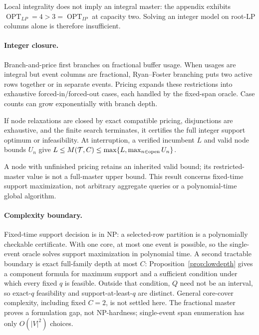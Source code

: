 Local integrality does not imply an integral master: the appendix exhibits
$\operatorname{OPT}_{LP}=4>3=\operatorname{OPT}_{IP}$ at capacity two.
Solving an integer model on root-LP columns alone is therefore insufficient.

\paragraph{Integer closure.}
\label{sec:bp}
Branch-and-price first branches on fractional buffer usage. When usages are
integral but event columns are fractional, Ryan--Foster branching puts two
active rows together or in separate events. Pricing expands these restrictions
into exhaustive forced-in/forced-out cases, each handled by the fixed-span
oracle. Case counts can grow exponentially with branch depth.

\begin{proposition}
\label{prop:bp}
If node relaxations are closed by exact compatible pricing, disjunctions are
exhaustive, and the finite search terminates, it certifies the full integer
support optimum or infeasibility. At interruption, a verified incumbent $L$
and valid node bounds $U_n$ give
$L\le M(\mathcal T,C)\le\max\{L,\max_{n\in\mathrm{open}}U_n\}$.
\end{proposition}

A node with unfinished pricing retains an inherited valid bound; its
restricted-master value is not a full-master upper bound. This result concerns
fixed-time support maximization, not arbitrary aggregate queries or a
polynomial-time global algorithm.

\paragraph{Complexity boundary.}
Fixed-time support decision is in NP: a selected-row partition is a
polynomially checkable certificate. With one core, at most one event is
possible, so the single-event oracle solves support maximization in polynomial
time. A second tractable boundary is exact full-family depth at most $C$:
Proposition~\ref{prop:lowdepth} gives a component formula for maximum support
and a sufficient condition under which every fixed $q$ is feasible. Outside
that condition, $Q$ need not be an interval, so exact-$q$ feasibility and
support-at-least-$q$ are distinct. General core-cover complexity, including
fixed $C=2$, is not settled here. The fractional master proves a formulation
gap, not NP-hardness; single-event span enumeration has only $O(|V|^2)$ choices.

